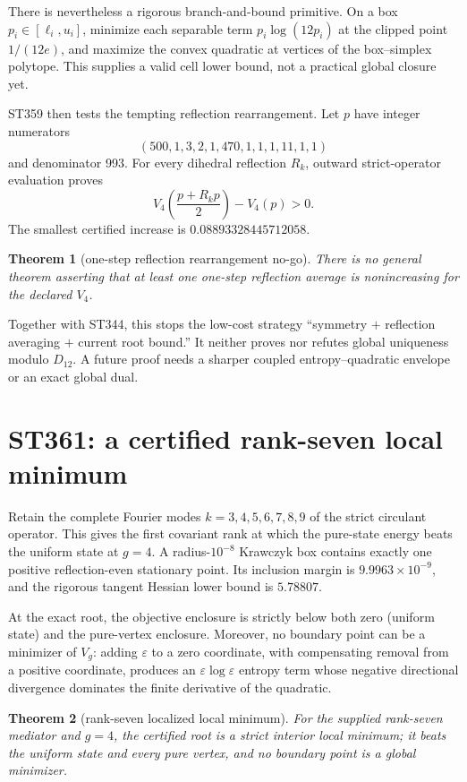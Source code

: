 \documentclass[11pt,a4paper]{article}
\newtheorem{theorem}{Theorem}[section]
\begin{document}
There is nevertheless a rigorous branch-and-bound primitive. On a box
$p_i\in[\ell_i,u_i]$, minimize each separable term $p_i\log(12p_i)$ at the clipped point
$1/(12e)$, and maximize the convex quadratic at vertices of the box--simplex polytope.
This supplies a valid cell lower bound, not a practical global closure yet.

ST359 then tests the tempting reflection rearrangement. Let $p$ have integer numerators
\[
(500,1,3,2,1,470,1,1,1,11,1,1)
\]
and denominator 993. For every dihedral reflection $R_k$, outward strict-operator evaluation
proves
\[
V_4\!\left(\frac{p+R_kp}{2}\right)-V_4(p)>0.
\]
The smallest certified increase is $0.08893328445712058$.

\begin{theorem}[one-step reflection rearrangement no-go]
There is no general theorem asserting that at least one one-step reflection average is
nonincreasing for the declared $V_4$.
\end{theorem}

Together with ST344, this stops the low-cost strategy ``symmetry $+$ reflection averaging
$+$ current root bound.'' It neither proves nor refutes global uniqueness modulo $D_{12}$.
A future proof needs a sharper coupled entropy--quadratic envelope or an exact global dual.

\section{ST361: a certified rank-seven local minimum}

Retain the complete Fourier modes $k=3,4,5,6,7,8,9$ of the strict circulant operator. This
gives the first covariant rank at which the pure-state energy beats the uniform state at
$g=4$. A radius-$10^{-8}$ Krawczyk box contains exactly one positive reflection-even
stationary point. Its inclusion margin is $9.9963\times10^{-9}$, and the rigorous tangent
Hessian lower bound is $5.78807$.

At the exact root, the objective enclosure is strictly below both zero (uniform state) and
the pure-vertex enclosure. Moreover, no boundary point can be a minimizer of $V_g$: adding
$\varepsilon$ to a zero coordinate, with compensating removal from a positive coordinate,
produces an $\varepsilon\log\varepsilon$ entropy term whose negative directional divergence
dominates the finite derivative of the quadratic.

\begin{theorem}[rank-seven localized local minimum]
For the supplied rank-seven mediator and $g=4$, the certified root is a strict interior
local minimum; it beats the uniform state and every pure vertex, and no boundary point is a
global minimizer.
\end{theorem}
\end{document}
